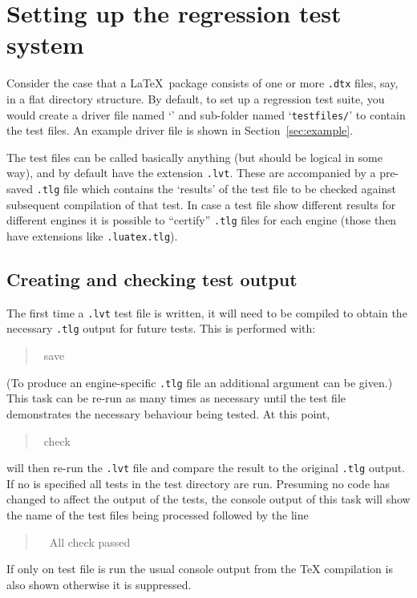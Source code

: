 \documentclass[a4paper]{ltugboat}
\begin{document}
\section{Setting up the regression test system}

Consider the case that a \LaTeX\ package consists of one or more
\texttt{.dtx} files, say, in a flat directory structure.  By default,
to set up a regression test suite, you would create a driver file
named `\texttt{\drivername}' and sub-folder named
`\texttt{testfiles/}' to contain the test files.  An example driver
file is shown in Section~\ref{sec:example}.

The test files can be called basically anything (but should be logical
in some way), and by default have the extension \texttt{.lvt}.  These are
accompanied by a pre-saved \texttt{.tlg} file which contains the
`results' of the test file to be checked against subsequent
compilation of that test. In case a test file show different results for different engines it is possible to ``certify'' \texttt{.tlg} files for each engine (those then have extensions like \texttt{.luatex.tlg}).


\subsection{Creating and checking test output}

The first time a \texttt{.lvt} test file is written, it will need to
be compiled to obtain the necessary \texttt{.tlg} output for future
tests.  This is performed with:
\begin{quote}\ttfamily
\execname~save~
\end{quote}
(To produce an engine-specific \texttt{.tlg} file an additional
 argument can be given.)  This task can be re-run as
many times as necessary until the test file demonstrates the necessary
behaviour being tested.
%
At this point, 
\begin{quote}\ttfamily
\execname~check~
\end{quote}
will then re-run the \texttt{.lvt} file and compare the result to the
original \texttt{.tlg} output.  
If no  is specified all tests in the test directory are run. Presuming no code has changed to
affect the output of the tests, the console output of this task will show the name of the test files being processed followed by the line
\begin{quote}\ttfamily
~~All check passed
\end{quote}
If only on test file is run the usual console output from the \TeX{} compilation is also shown otherwise it is suppressed.
\end{document}
